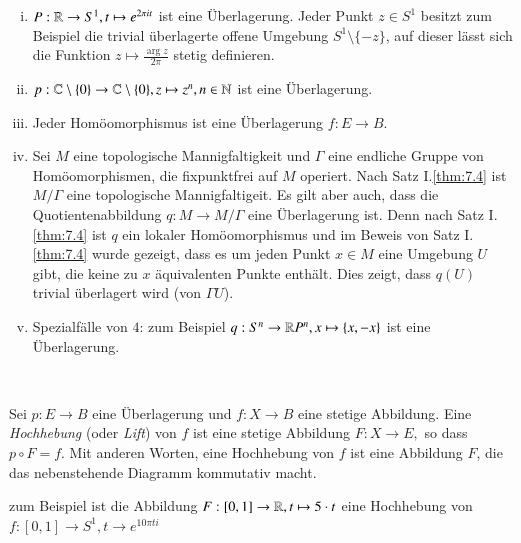 \documentclass[a4paper,10pt]{scrartcl}
\begin{document}
\begin{exs*}
 \begin{enumerate}[(i)]
  \item $P: \mathbb{R}\to S^1, t\mapsto e^{2\pi it}$ ist eine Überlagerung. Jeder Punkt $z\in S^1$ besitzt zum Beispiel die trivial überlagerte offene Umgebung $S^1\setminus\{-z\}$, 
auf dieser lässt sich die Funktion $z\mapsto \frac{\arg{z}}{2\pi}$ stetig definieren. \\
\begin{figure}[H]
\centering
 \fixme[fig70]
\caption{}
\end{figure}
  \item $p:\mathbb{C}\setminus\{0\}\to \mathbb{C} \setminus\{0\}, z \mapsto z^n, n\in \mathbb{N}$ ist eine Überlagerung.
  \item Jeder Homöomorphismus ist eine Überlagerung $f: E\to B$.
  \item Sei $M$ eine topologische Mannigfaltigkeit und $\Gamma$ eine endliche Gruppe von Homöomorphismen, 
die fixpunktfrei auf $M$ operiert. Nach Satz I.\ref{thm:7.4} ist $M/\Gamma$ eine topologische Mannigfaltigeit. Es  gilt aber auch, dass die Quotientenabbildung $q:M \to M/\Gamma$ eine Überlagerung ist. Denn nach Satz I.\ref{thm:7.4}
ist $q$ ein lokaler Homöomorphismus und im Beweis von Satz I.\ref{thm:7.4} wurde gezeigt, dass es um jeden Punkt $x\in M$ eine Umgebung $U$ gibt, die keine zu $x$ äquivalenten Punkte enthält. Dies zeigt, dass $q(U)$ trivial überlagert wird (von $\Gamma U$).
  \item Spezialfälle von $4$: zum Beispiel $q: S^n\to \mathbb{R} P^n, x \mapsto \{x, -x\}$ ist eine Überlagerung.\\
\begin{figure}[H]
\centering
 \fixme[fig71]
\caption{}
\end{figure}
 \end{enumerate}
\end{exs*}
\\
\begin{df}
 Sei $p: E\to B$ eine Überlagerung und $f:X\to B$ eine stetige Abbildung.  Eine \emph{Hochhebung} (oder \emph{Lift}) von $f$ ist eine stetige Abbildung $F: X \to E,$ so dass $p\circ F=f$. Mit anderen Worten, eine Hochhebung von $f$ ist eine Abbildung $F$, die das nebenstehende Diagramm kommutativ macht.\\
\begin{center}
\end{center}

\end{df}
zum Beispiel ist die Abbildung $F:[0,1]\to \mathbb{R}, t\mapsto  5 \cdot t$ eine Hochhebung von $f: [0,1]\to S^1, t \to e^{10\pi t i}$
\end{document}
